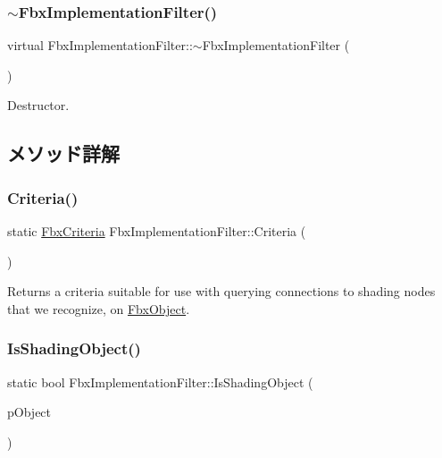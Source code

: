 \subsubsection{\texorpdfstring{$\sim$\+Fbx\+Implementation\+Filter()}{~FbxImplementationFilter()}}
{\footnotesize\ttfamily virtual Fbx\+Implementation\+Filter\+::$\sim$\+Fbx\+Implementation\+Filter (\begin{DoxyParamCaption}{ }\end{DoxyParamCaption})\hspace{0.3cm}{\ttfamily [virtual]}}



Destructor. 



\subsection{メソッド詳解}
\mbox{\label{class_fbx_implementation_filter_a343590c07f9897b9cf8ceed11b979491}} 
\subsubsection{\texorpdfstring{Criteria()}{Criteria()}}
{\footnotesize\ttfamily static \hyperlink{class_fbx_criteria}{Fbx\+Criteria} Fbx\+Implementation\+Filter\+::\+Criteria (\begin{DoxyParamCaption}{ }\end{DoxyParamCaption})\hspace{0.3cm}{\ttfamily [static]}}

Returns a criteria suitable for use with querying connections to shading nodes that we recognize, on \hyperlink{class_fbx_object}{Fbx\+Object}. \mbox{\label{class_fbx_implementation_filter_a3109594701842272e84f683f696d8e4b}} 
\subsubsection{\texorpdfstring{Is\+Shading\+Object()}{IsShadingObject()}}
{\footnotesize\ttfamily static bool Fbx\+Implementation\+Filter\+::\+Is\+Shading\+Object (\begin{DoxyParamCaption}\item[{const \hyperlink{class_fbx_object}{Fbx\+Object} $\ast$}]{p\+Object }\end{DoxyParamCaption})\hspace{0.3cm}{\ttfamily [static]}}

